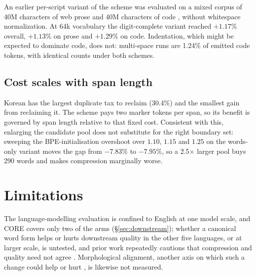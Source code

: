 \documentclass[11pt]{article}
\begin{document}
An earlier per-script variant of the scheme was evaluated on a mixed corpus of 40M
characters of web prose and 40M characters of code \citep{codeparrot,rosettacode}, without
whitespace normalization. At 64k vocabulary the digit-complete variant reached $+1.17\%$
overall, $+1.13\%$ on prose and $+1.29\%$ on code. Indentation, which might be expected to
dominate code, does not: multi-space runs are 1.24\% of emitted code tokens, with identical
counts under both schemes.

\subsection{Cost scales with span length}

Korean has the largest duplicate tax to reclaim (30.4\%) and the smallest gain from
reclaiming it. The scheme pays two marker tokens per span, so its benefit is governed by
span length relative to that fixed cost. Consistent with this, enlarging the candidate pool
does not substitute for the right boundary set: sweeping the BPE-initialisation overshoot
\citep{land2026mingram} over $1.10$, $1.15$ and $1.25$ on the words-only variant moves the
gap from $-7.83\%$ to $-7.95\%$, so a 2.5$\times$ larger pool buys 290 words and makes
compression marginally worse.

\newcommand{\downstreamdir}{../downstream/paper}


\section{Limitations}
\label{sec:limitations}




The language-modelling evaluation is confined to English at one model scale, and CORE covers
only two of the arms (\S\ref{sec:downstream}); whether a canonical word form helps or hurts
downstream quality in the other five languages, or at larger scale, is untested, and prior
work repeatedly cautions that compression and quality need not agree
\citep{rust-etal-2021-good,zouhar-etal-2023-tokenization,cognetta-etal-2024-two,ali-etal-2024-tokenizer,lotz-etal-2025-beyond}.
Morphological alignment, another axis on which such a change could help or hurt
\citep{bostrom-durrett-2020-byte,arnett2025evaluatingmorphologicalalignmenttokenizers}, is
likewise not measured.
\end{document}
